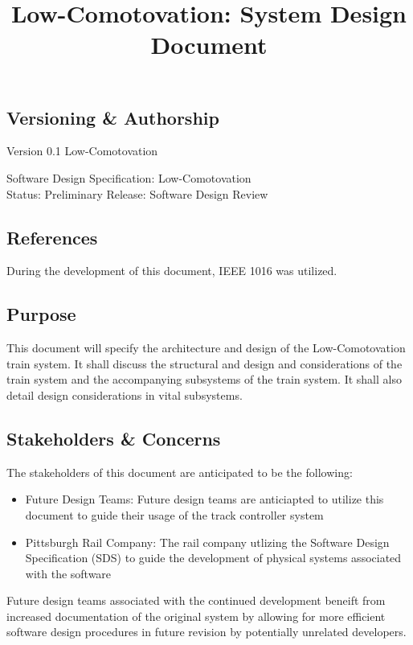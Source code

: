 \documentclass[]{article}
\title{Low-Comotovation: System Design Document}
\author{}
\date{}
\begin{document}
\maketitle
\tableofcontents
\titlepage

\subsection{Versioning \& Authorship}
Version 0.1
\newline
Low-Comotovation \textcopyright

\raggedright
Software Design Specification: Low-Comotovation \\
Status: Preliminary Release: Software Design Review

\subsection{References}
During the development of this document, IEEE 1016 was utilized.

\subsection{Purpose}
This document will specify the architecture and design of the Low-Comotovation train system. It shall discuss the structural and design and considerations of the train system and the accompanying subsystems of the train system. It shall also detail design considerations in vital subsystems.

\subsection{Stakeholders \& Concerns}
The stakeholders of this document are anticipated to be the following:
\begin{itemize}
	\item Future Design Teams: Future design teams are anticiapted to utilize this document to guide their usage of the track controller system
	\item Pittsburgh Rail Company: The rail company utlizing the Software Design Specification (SDS) to guide the development of physical systems associated with the software
\end{itemize}

Future design teams associated with the continued development beneift from increased documentation of the original system by allowing for more efficient software design procedures in future revision by potentially unrelated developers.
\end{document}
